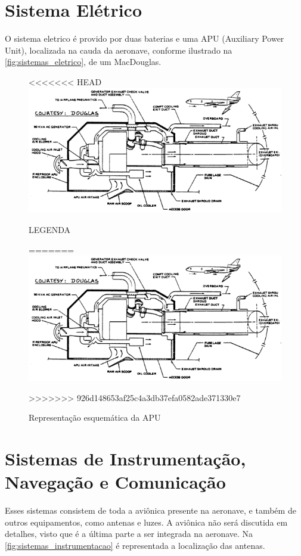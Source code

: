 \section{Sistema Elétrico}

O sistema eletrico é provido por duas baterias e uma APU (Auxiliary Power Unit), localizada na cauda da aeronave, conforme ilustrado na \autoref{fig:sistemas_eletrico}, de um MacDouglas.

\begin{figure}
<<<<<<< HEAD
\centering
\includegraphics{images/parte3/sistemas_eletrico.png}
\caption{LEGENDA}
=======
\includegraphics[width=\textwidth]{images/parte3/sistemas_eletrico.png}
\caption{Representação esquemática da APU}
>>>>>>> 926d148653af25c4a3db37efa0582ade371330e7
\label{fig:sistemas_eletrico}
\end{figure}

\section{Sistemas de Instrumentação, Navegação e Comunicação}

Esses sistemas consistem de toda a aviônica presente na aeronave, e também de outros equipamentos, como antenas e luzes.
A aviônica não será discutida em detalhes, visto que é a última parte a ser integrada na aeronave.
Na \autoref{fig:sistemas_instrumentacao} é representada a localização das antenas.

